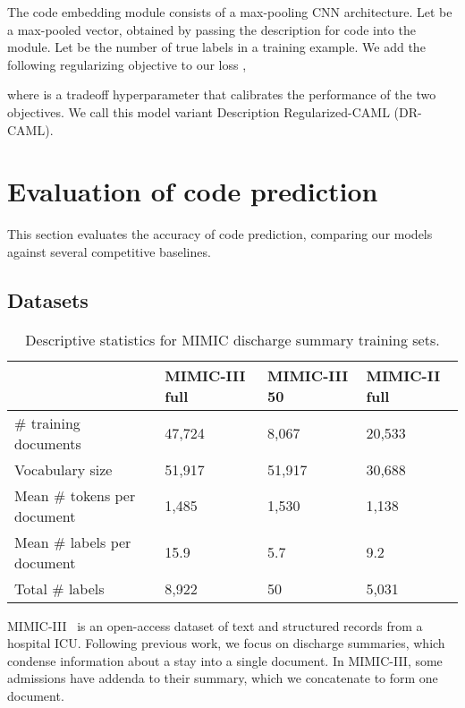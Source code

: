\documentclass[11pt,a4paper]{article}
\begin{document}
The code embedding module consists of a max-pooling CNN architecture. Let  be a max-pooled vector, obtained by passing the description for code  into the module. Let  be the number of true labels in a training example. We add the following regularizing objective to our loss ,

where  is a tradeoff hyperparameter that calibrates the performance of the two objectives. We call this model variant Description Regularized-CAML (DR-CAML).
 
\section{Evaluation of code prediction}
This section evaluates the accuracy of code prediction, comparing our models against several competitive baselines.

\subsection{Datasets}
\begin{table*}
\centering
\begin{tabular}{llll}
\toprule
& \textbf{MIMIC-III full} & \textbf{MIMIC-III 50} & \textbf{MIMIC-II full} \\ \midrule
\# training documents                &  47,724               &    8,067                & 20,533                 \\
Vocabulary size             & 51,917                & 51,917                  & 30,688                 \\
Mean \# tokens per document & 1,485                 & 1,530                  & 1,138                  \\
Mean \# labels per document & 15.9                 & 5.7                   & 9.2                    \\
Total \# labels             & 8,922                   & 50                  & 5,031 \\ \bottomrule
\end{tabular}
\caption{Descriptive statistics for MIMIC discharge summary training sets.}
\label{tab:stats}
\end{table*}
 
MIMIC-III~\cite{johnson2016mimic} is an open-access dataset of text and structured records from a hospital ICU. Following previous work, we focus on discharge summaries, which condense information about a stay into a single document. In MIMIC-III, some admissions have addenda to their summary, which we concatenate to form one document.
\end{document}
